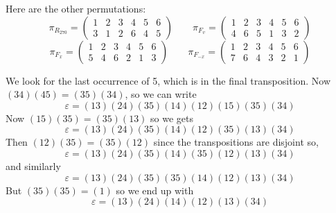 \documentclass[10pt]{exam}
\renewenvironment{Ans}[1]{\setcounter{question}{#1}\addtocounter{question}{-1}\question }{}
\begin{document}
\begin{questions}
\begin{Ans}{1}
 Here are the other permutations:
 \[\pi_{R_{270}} = \begin{pmatrix} 1 & 2 & 3 & 4 & 5 & 6 \\ 3 & 1 & 2 & 6 & 4 & 5\end{pmatrix} \qquad \pi_{F_v} = \begin{pmatrix}1 & 2 & 3 & 4 & 5 & 6 \\ 4 & 6 & 5 & 1 & 3 & 2\end{pmatrix}\]
 \[\pi_{F_{x}} = \begin{pmatrix} 1 & 2 & 3 & 4 & 5 & 6 \\ 5 & 4 & 6 & 2 & 1 & 3 \end{pmatrix} \qquad \pi_{F_{-x}} = \begin{pmatrix}1 & 2 & 3 & 4 & 5 & 6 \\ 7 & 6 & 4 & 3 & 2 & 1\end{pmatrix}\]
\end{Ans}
\begin{Ans}{2}
  We look for the last occurrence of 5, which is in the final transposition.  Now $(34)(45) = (35)(34)$, so we can write
  \[\varepsilon = (13)(24)(35)(14)(12)(15)(35)(34)\]
  Now $(15)(35) = (35)(13)$ so we gets
   \[\varepsilon = (13)(24)(35)(14)(12)(35)(13)(34)\]
   Then $(12)(35) = (35)(12)$ since the transpositions are disjoint so,
   \[\varepsilon = (13)(24)(35)(14)(35)(12)(13)(34)\]
   and similarly
   \[\varepsilon = (13)(24)(35)(35)(14)(12)(13)(34)\]
   But $(35)(35) = (1)$ so we end up with
   \[\varepsilon = (13)(24)(14)(12)(13)(34)\]
\end{Ans}
\begin{Ans}{3}
\end{Ans}
\end{questions}
\end{document}
